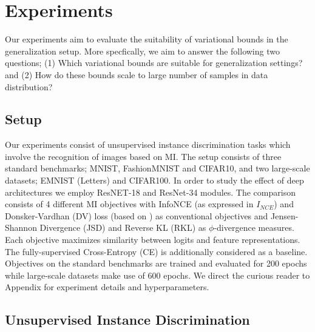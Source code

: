 \documentclass{article}
\begin{document}
\section{Experiments}
Our experiments aim to evaluate the suitability of variational bounds in the generalization setup. More specfically, we aim to answer the following two questions; (1) Which variational bounds are suitable for generalization settings? and (2) How do these bounds scale to large number of samples in data distribution? 

\subsection{Setup}
Our experiments consist of unsupervised instance discrimination tasks \cite{visual} which involve the recognition of images based on MI. The setup consists of three standard benchmarks; MNIST, FashionMNIST and CIFAR10, and two large-scale datasets; EMNIST (Letters) and CIFAR100. In order to study the effect of deep architectures we employ ResNET-18 and ResNet-34 modules. The comparison consists of 4 different MI objectives with InfoNCE (as expressed in $I_{NCE}$) and Donsker-Vardhan (DV) loss (based on \cite{infomax}) as conventional objectives and Jensen-Shannon Divergence (JSD) and Reverse KL (RKL) as $\phi$-divergence measures. Each objective maximizes similarity between logits and feature representations. The fully-supervised Cross-Entropy (CE) is additionally considered as a baseline. Objectives on the standard benchmarks are trained and evaluated for 200 epochs while large-scale datasets make use of 600 epochs. We direct the curious reader to Appendix for experiment details and hyperparameters.  

\subsection{Unsupervised Instance Discrimination}
\end{document}
